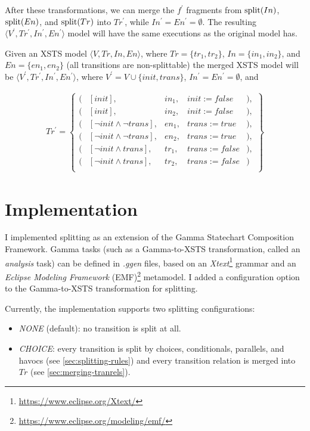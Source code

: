 After these transformations, we can merge the $f^\prime$ fragments from $\mathrm{split}(In)$, $\mathrm{split}(En)$, and $\mathrm{split}(Tr)$ into $Tr^\prime$, while $In^\prime = En^\prime = \emptyset$. The resulting $\langle V^\prime, Tr^\prime, In^\prime, En^\prime \rangle$ model will have the same executions as the original model has.

\begin{example}
Given an XSTS model $\langle V, Tr, In, En \rangle$, where $Tr = \{ tr_1, tr_2 \}$, $In = \{ in_1, in_2 \}$, and $En = \{ en_1, en_2 \}$ (all transitions are non-splittable) the merged XSTS model will be $\langle V^\prime, Tr^\prime, In^\prime, En^\prime \rangle$, where $V^\prime = V \cup \{ init, trans \}$, $In^\prime = En^\prime = \emptyset$, and

\begin{align*}
Tr^\prime = \begin{Bmatrix}
(&[init],& in_1,& init := \textit{false}&), \\
(&[init],& in_2,& init := \textit{false}&), \\
(&[\neg init \land \neg trans],& en_1,& trans := \textit{true}&), \\
(&[\neg init \land \neg trans],& en_2,& trans := \textit{true}&), \\
(&[\neg init \land trans],& tr_1, &trans := \textit{false}&), \\
(&[\neg init \land trans],& tr_2, &trans := \textit{false}&) \\
\end{Bmatrix}
\end{align*}
\end{example}

\section{Implementation}\label{sec:split-impl}

I implemented splitting as an extension of the Gamma Statechart Composition Framework. Gamma tasks (such as a Gamma-to-XSTS transformation, called an \textit{analysis} task) can be defined in \textit{.ggen} files, based on an \textit{Xtext}\footnote{\url{https://www.eclipse.org/Xtext/}} grammar and an \textit{Eclipse Modeling Framework} (EMF)\footnote{\url{https://www.eclipse.org/modeling/emf/}} metamodel. I added a configuration option to the Gamma-to-XSTS transformation for splitting.

Currently, the implementation supports two splitting configurations:
\begin{itemize}
    \item \textit{NONE} (default): no transition is split at all.
    \item \textit{CHOICE}: every transition is split by choices, conditionals, parallels, and havocs (see \autoref{sec:splitting-rules}) and every transition relation is merged into $Tr$ (see \autoref{sec:merging-tranrels}).
\end{itemize}

